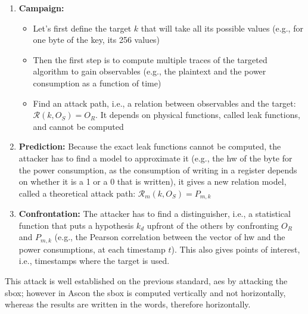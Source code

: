 \documentclass[11pt,technote]{IEEEtran}
\begin{document}
		\begin{enumerate}
			\item \textbf{Campaign:}
			\begin{itemize}
				\item Let's first define the target $k$ that will take all its possible values (e.g., for one byte of the key, its 256 values)
				\item Then the first step is to compute multiple traces of the targeted algorithm to gain observables (e.g., the plaintext and the power consumption as a function of time)
				\item Find an attack path, i.e., a relation between observables and the target: $\mathcal{R}(k,O_S) = O_R$. It depends on physical functions, called leak functions, and cannot be computed
			\end{itemize}
			\item \textbf{Prediction:} Because the exact leak functions cannot be computed, the attacker has to find a model to approximate it (e.g., the \ac{hw} of the byte for the power consumption, as the consumption of writing in a register depends on whether it is a 1 or a 0 that is written), it gives a new relation model, called a theoretical attack path: $\mathcal{R}_m(k,O_S) = P_{m,k}$
			\item \textbf{Confrontation:} The attacker has to find a distinguisher, i.e., a statistical function that puts a hypothesis $k_d$ upfront of the others by confronting $O_R$ and $P_{m,k}$ (e.g., the Pearson correlation between the vector of \ac{hw} and the power consumptions, at each timestamp $t$). This also gives points of interest, i.e., timestamps where the target is used.
		\end{enumerate}

		This attack is well established on the previous standard, \ac{aes} \cite{cpa_aes,aes} by attacking the \ac{sbox}; however in Ascon the \ac{sbox} is computed vertically and not horizontally, whereas the results are written in the words, therefore horizontally.
		
\end{document}
